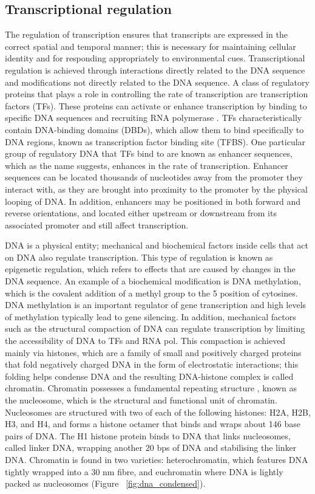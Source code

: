 \subsection{Transcriptional regulation}

The regulation of transcription ensures that transcripts are expressed in the correct spatial and temporal manner; this is necessary for maintaining cellular identity and for responding appropriately to environmental cues. Transcriptional regulation is achieved through interactions directly related to the DNA sequence and modifications not directly related to the DNA sequence. A class of regulatory proteins that plays a role in controlling the rate of transcription are transcription factors (TFs). These proteins can activate or enhance transcription by binding to specific DNA sequences and recruiting RNA polymerase \citep{pmid11092823}. TFs characteristically contain DNA-binding domains (DBDs), which allow them to bind specifically to DNA regions, known as transcription factor binding site (TFBS). One particular group of regulatory DNA that TFs bind to are known as enhancer sequences, which as the name suggests, enhances in the rate of transcription. Enhancer sequences can be located thousands of nucleotides away from the promoter they interact with, as they are brought into proximity to the promoter by the physical looping of DNA. In addition, enhancers may be positioned in both forward and reverse orientations, and located either upstream or downstream from its associated promoter and still affect transcription.

DNA is a physical entity; mechanical and biochemical factors inside cells that act on DNA also regulate transcription. This type of regulation is known as epigenetic regulation, which refers to effects that are caused by changes in the DNA sequence. An example of a biochemical modification is DNA methylation, which is the covalent addition of a methyl group to the 5 position of cytosines. DNA methylation is an important regulator of gene transcription and high levels of methylation typically lead to gene silencing. In addition, mechanical factors such as the structural compaction of DNA can regulate transcription by limiting the accessibility of DNA to TFs and RNA pol. This compaction is achieved mainly via histones, which are a family of small and positively charged proteins that fold negatively charged DNA in the form of electrostatic interactions; this folding helps condense DNA and the resulting DNA-histone complex is called chromatin. Chromatin possesses a fundamental repeating structure \citep{holde01111974}, known as the nucleosome, which is the structural and functional unit of chromatin. Nucleosomes are structured with two of each of the following histones: H2A, H2B, H3, and H4, and forms a histone octamer that binds and wraps about 146 base pairs of DNA. The H1 histone protein binds to DNA that links nucleosomes, called linker DNA, wrapping another 20 bps of DNA and stabilising the linker DNA. Chromatin is found in two varieties: heterochromatin, which features DNA tightly wrapped into a 30 nm fibre, and euchromatin where DNA is lightly packed as nucleosomes (Figure ~\ref{fig:dna_condensed}).

